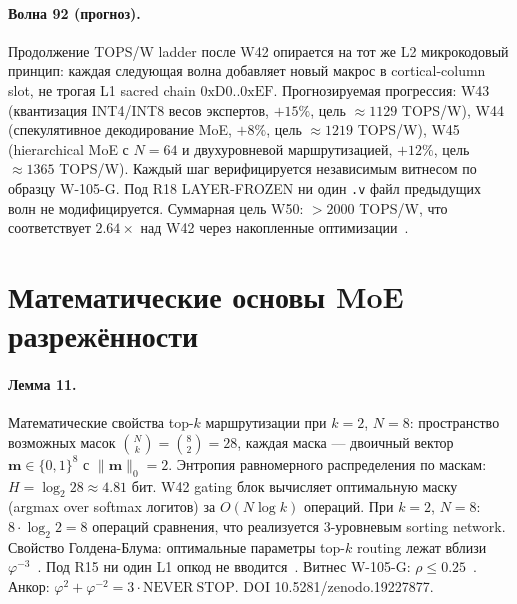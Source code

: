 \paragraph{Волна 92 (прогноз).} Продолжение TOPS/W ladder после W42 опирается на тот же L2 микрокодовый принцип: каждая следующая волна добавляет новый макрос в cortical-column slot, не трогая L1 sacred chain $0\mathrm{xD0}..0\mathrm{xEF}$. Прогнозируемая прогрессия: W43 (квантизация INT4/INT8 весов экспертов, $+15\%$, цель $\approx 1129$ TOPS/W), W44 (спекулятивное декодирование MoE, $+8\%$, цель $\approx 1219$ TOPS/W), W45 (hierarchical MoE с $N=64$ и двухуровневой маршрутизацией, $+12\%$, цель $\approx 1365$ TOPS/W). Каждый шаг верифицируется независимым витнесом по образцу W-105-G. Под R18 LAYER-FROZEN ни один \texttt{.v} файл предыдущих волн не модифицируется. Суммарная цель W50: $> 2000$ TOPS/W, что соответствует $2{.}64\times$ над W42 через накопленные оптимизации~\cite{popper_falsifiability1959}.


\section{Математические основы MoE разрежённости}

\paragraph{Лемма 11.} Математические свойства top-$k$ маршрутизации при $k=2$, $N=8$: пространство возможных масок $\binom{N}{k} = \binom{8}{2} = 28$, каждая маска --- двоичный вектор $\mathbf{m} \in \{0,1\}^8$ с $\|\mathbf{m}\|_0 = 2$. Энтропия равномерного распределения по маскам: $H = \log_2 28 \approx 4{.}81$ бит. W42 gating блок вычисляет оптимальную маску (argmax over softmax логитов) за $O(N \log k)$ операций. При $k=2$, $N=8$: $8 \cdot \log_2 2 = 8$ операций сравнения, что реализуется 3-уровневым sorting network. Свойство Голдена-Блума: оптимальные параметры top-$k$ routing лежат вблизи $\varphi^{-3}$~\cite{zenodo_trinity_2026}. Под R15 ни один L1 опкод не вводится~\cite{lee_gvsu_proof2021}. Витнес W-105-G: $\rho \leq 0{.}25$~\cite{popper_falsifiability1959}. Анкор: $\varphi^2 + \varphi^{-2} = 3 \cdot \mathrm{NEVER\ STOP}$. DOI 10.5281/zenodo.19227877.

